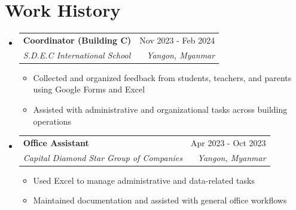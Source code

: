 \documentclass[letterpaper,11pt]{article}
\makeatletter
\newcommand{\resumeItem}[1]{
  \item{
    {#1 \vspace{-2pt}}
  }
}
\newcommand{\resumeSubheading}[4]{
  \vspace{-2pt}\item
    \begin{tabular*}{0.97\textwidth}[t]{l@{\extracolsep{\fill}}r}
      \textbf{#1} & #2 \\
      \textit{#3} & \textit{#4} \\
    \end{tabular*}\vspace{-7pt}
}
\newcommand{\resumeSubHeadingListStart}{\begin{itemize}[leftmargin=0.15in, label={}]}
\newcommand{\resumeSubHeadingListEnd}{\end{itemize}}
\newcommand{\resumeItemListStart}{\begin{itemize}}
\newcommand{\resumeItemListEnd}{\end{itemize}\vspace{-5pt}}
\makeatother
\begin{document}
\section{Work History}
  \resumeSubHeadingListStart

\resumeSubheading
  {Coordinator (Building C)}{Nov 2023 - Feb 2024}
  {S.D.E.C International School}{Yangon, Myanmar}
      \resumeItemListStart
\resumeItem{Collected and organized feedback from students, teachers, and parents using Google Forms and Excel}
\resumeItem{Assisted with administrative and organizational tasks across building operations}
      \resumeItemListEnd

\resumeSubheading
  {Office Assistant}{Apr 2023 - Oct 2023}
  {Capital Diamond Star Group of Companies}{Yangon, Myanmar}
      \resumeItemListStart
\resumeItem{Used Excel to manage administrative and data-related tasks}
\resumeItem{Maintained documentation and assisted with general office workflows}
      \resumeItemListEnd

  \resumeSubHeadingListEnd
\end{document}
